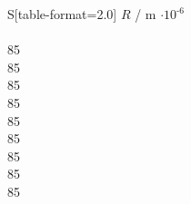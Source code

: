 \begin{table}[!htp]
\centering
\caption{Der Radius des Drahtes.}
\label{tab:draht}
\begin{tabular}{S[table-format=2.0]}
\toprule
{$R$ / m $\cdot 10^\text{-6}$} \\
 \\
85 \\
85 \\
85 \\
85 \\
85 \\
85 \\
85 \\
85 \\
85 \\
\bottomrule
\end{tabular}
\end{table}